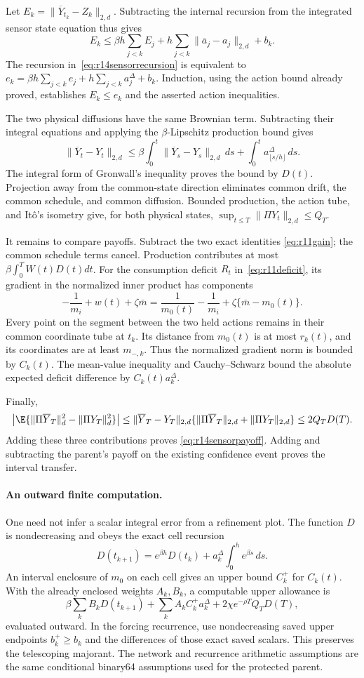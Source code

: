 Let $E_k=\|\overline Y_{t_k}-Z_k\|_{2,d}$. Subtracting the internal
recursion from the integrated sensor state equation thus gives
\[
 E_k\leq\beta h\sum_{j<k}E_j
       +h\sum_{j<k}\|\overline a_j-a_j\|_{2,d}+b_k.
\]
The recursion in~\eqref{eq:r14sensorrecursion} is equivalent to
$e_k=\beta h\sum_{j<k}e_j+h\sum_{j<k}a_j^\Delta+b_k$.
Induction, using the action bound already proved, establishes
$E_k\leq e_k$ and the asserted action inequalities.

The two physical diffusions have the same Brownian term. Subtracting
their integral equations and applying the $\beta$-Lipschitz production
bound gives
\[
 \|\overline Y_t-Y_t\|_{2,d}
 \leq\beta\int_0^t\|\overline Y_s-Y_s\|_{2,d}\,ds
       +\int_0^t a_{\lfloor s/h\rfloor}^\Delta\,ds.
\]
The integral form of Gronwall's inequality proves the bound by $D(t)$.
Projection away from the common-state direction eliminates common
drift, the common schedule, and common diffusion. Bounded production,
the action tube, and It\^o's isometry give, for both physical states,
$\sup_{t\leq T}\|\Pi Y_t\|_{2,d}\leq Q_T$.

It remains to compare payoffs. Subtract the two exact identities
\eqref{eq:r11gain}; the common schedule terms cancel. Production
contributes at most $\beta\int_0^TW(t)D(t)dt$.
For the consumption deficit $R_t$ in~\eqref{eq:r11deficit}, its gradient
in the normalized inner product has components
\[
 -\frac1{m_i}+w(t)+\zeta\bar m
  =\frac1{m_0(t)}-\frac1{m_i}
       +\zeta\{\bar m-m_0(t)\}.
\]
Every point on the segment between the two held actions remains in
their common coordinate tube at $t_k$. Its distance from $m_0(t)$ is
at most $r_k(t)$, and its coordinates are at least $m_{-,k}$. Thus the
normalized gradient norm is bounded by $C_k(t)$. The mean-value
inequality and Cauchy--Schwarz bound the absolute expected deficit
difference by $C_k(t)a_k^\Delta$.

Finally,
\[
 \left|\E\{\|\Pi\overline Y_T\|_d^2-\|\Pi Y_T\|_d^2\}\right|
 \leq\|\overline Y_T-Y_T\|_{2,d}
       \{\|\Pi\overline Y_T\|_{2,d}+\|\Pi Y_T\|_{2,d}\}
 \leq2Q_TD(T).
\]
Adding these three contributions proves
\eqref{eq:r14sensorpayoff}. Adding and subtracting the parent's payoff
on the existing confidence event proves the interval transfer.

\paragraph*{An outward finite computation.}
One need not infer a scalar integral error from a refinement plot.
The function $D$ is nondecreasing and obeys the exact cell recursion
\[
 D(t_{k+1})=e^{\beta h}D(t_k)
                +a_k^\Delta\int_0^h e^{\beta s}\,ds.
\]
An interval enclosure of $m_0$ on each cell gives an upper bound
$C_k^+$ for $C_k(t)$. With the already enclosed weights $A_k,B_k$,
a computable upper allowance is
\[
 \beta\sum_k B_kD(t_{k+1})
       +\sum_k A_kC_k^+a_k^\Delta
       +2\chi e^{-\rho T}Q_TD(T),
\]
evaluated outward. In the forcing recurrence, use nondecreasing saved
upper endpoints $b_k^+\geq b_k$ and the differences of those exact
saved scalars. This preserves the telescoping majorant. The network
and recurrence arithmetic assumptions are the same conditional
binary64 assumptions used for the protected parent.
